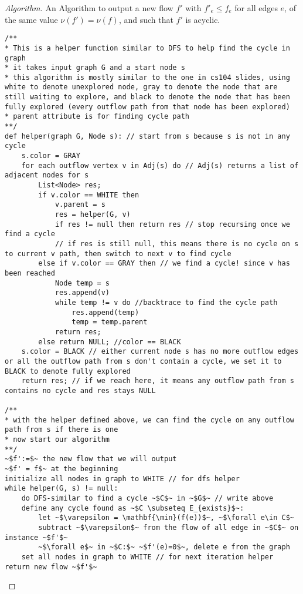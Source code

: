\documentclass[openany]{article}
\begin{document}
\begin{proof}[Algorithm]{}
		\renewcommand{\qedsymbol}{}
		An Algorithm to output a new flow $f'$ with $f'_e \leq f_e$ for all edges $e$, of the same value $\nu(f') = \nu(f)$, and such that $f'$ is acyclic.
		\begin{lstlisting}[basicstyle=\fontsize{8}{9}\selectfont\ttfamily]
/**
* This is a helper function similar to DFS to help find the cycle in graph
* it takes input graph G and a start node s
* this algorithm is mostly similar to the one in cs104 slides, using white to denote unexplored node, gray to denote the node that are still waiting to explore, and black to denote the node that has been fully explored (every outflow path from that node has been explored)
* parent attribute is for finding cycle path
**/
def helper(graph G, Node s): // start from s because s is not in any cycle
    s.color = GRAY
    for each outflow vertex v in Adj(s) do // Adj(s) returns a list of adjacent nodes for s
        List<Node> res;
        if v.color == WHITE then
            v.parent = s
            res = helper(G, v)
            if res != null then return res // stop recursing once we find a cycle
            // if res is still null, this means there is no cycle on s to current v path, then switch to next v to find cycle
        else if v.color == GRAY then // we find a cycle! since v has been reached 
            Node temp = s
            res.append(v)
            while temp != v do //backtrace to find the cycle path
                res.append(temp)
                temp = temp.parent
            return res;
        else return NULL; //color == BLACK
    s.color = BLACK // either current node s has no more outflow edges or all the outflow path from s don't contain a cycle, we set it to BLACK to denote fully explored
    return res; // if we reach here, it means any outflow path from s contains no cycle and res stays NULL
    
/**
* with the helper defined above, we can find the cycle on any outflow path from s if there is one
* now start our algorithm
**/
~$f':=$~ the new flow that we will output
~$f' = f$~ at the beginning
initialize all nodes in graph to WHITE // for dfs helper
while helper(G, s) != null:
    do DFS-similar to find a cycle ~$C$~ in ~$G$~ // write above
    define any cycle found as ~$C \subseteq E_{exists}$~:
        let ~$\varepsilon = \mathbf{\min}(f(e))$~, ~$\forall e\in C$~
        subtract ~$\varepsilon$~ from the flow of all edge in ~$C$~ on instance ~$f'$~
        ~$\forall e$~ in ~$C:$~ ~$f'(e)=0$~, delete e from the graph
    set all nodes in graph to WHITE // for next iteration helper
return new flow ~$f'$~
		\end{lstlisting} 
\end{proof}
\end{document}
